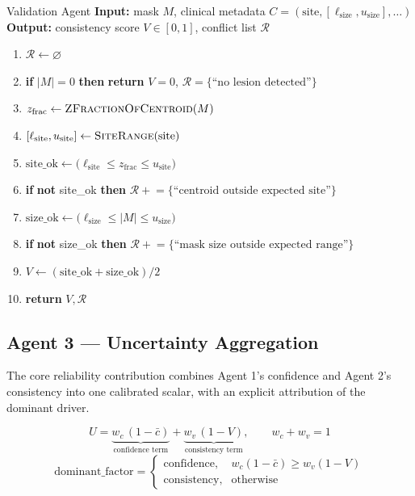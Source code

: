 \documentclass[11pt,a4paper]{article}
\newenvironment{algosteps}{\begin{enumerate}[label=\arabic*:, leftmargin=2.1em, itemsep=1pt, topsep=2pt]}{\end{enumerate}}
\newcommand{\algoreturn}[1]{\textbf{return} #1}
\newcommand{\algoif}[1]{\textbf{if} #1 \textbf{then}}
\begin{document}
\begin{algobox}{Validation Agent}
\textbf{Input:} mask $M$, clinical metadata $C = (\text{site}, [\ell_{\text{size}}, u_{\text{size}}], \dots)$ \\
\textbf{Output:} consistency score $V \in [0,1]$, conflict list $\mathcal{R}$
\begin{algosteps}
\item $\mathcal{R} \gets \varnothing$
\item \algoif{$|M| = 0$} \algoreturn{$V=0$, $\mathcal{R} = \{\text{``no lesion detected''}\}$}
\item $z_{\text{frac}} \gets \textsc{ZFractionOfCentroid}(M)$
\item $[\ell_{\text{site}}, u_{\text{site}}] \gets \textsc{SiteRange}(\text{site})$
\item $\text{site\_ok} \gets \big(\ell_{\text{site}} \le z_{\text{frac}} \le u_{\text{site}}\big)$
\item \algoif{\textbf{not} site\_ok} $\mathcal{R} \mathrel{+}= \{\text{``centroid outside expected site''}\}$
\item $\text{size\_ok} \gets \big(\ell_{\text{size}} \le |M| \le u_{\text{size}}\big)$
\item \algoif{\textbf{not} size\_ok} $\mathcal{R} \mathrel{+}= \{\text{``mask size outside expected range''}\}$
\item $V \gets (\text{site\_ok} + \text{size\_ok})/2$
\item \algoreturn{$V, \mathcal{R}$}
\end{algosteps}
\end{algobox}

\subsection{Agent 3 --- Uncertainty Aggregation}
The core reliability contribution combines Agent 1's confidence and Agent 2's consistency into one calibrated scalar, with an explicit attribution of the dominant driver.

\begin{formulabox}
\begin{equation}
U = \underbrace{w_c\,(1-\bar c)}_{\text{confidence term}} + \underbrace{w_v\,(1-V)}_{\text{consistency term}}, \qquad w_c + w_v = 1
\label{eq:U}
\end{equation}
\begin{equation}
\text{dominant\_factor} =
\begin{cases}
\text{confidence}, & w_c(1-\bar c) \geq w_v(1-V) \\
\text{consistency}, & \text{otherwise}
\end{cases}
\label{eq:dominant}
\end{equation}
\end{formulabox}
\end{document}
